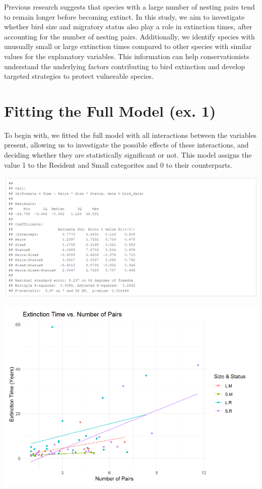 \documentclass{article}
\begin{document}
Previous research suggests that species with a large number of nesting pairs tend to remain longer before becoming extinct. In this study, we aim to investigate whether bird size and migratory status also play a role in extinction times, after accounting for the number of nesting pairs. Additionally, we identify species with unusually small or large extinction times compared to other species with similar values for the explanatory variables. This information can help conservationists understand the underlying factors contributing to bird extinction and develop targeted strategies to protect vulnerable species.

\section{Fitting the Full Model (ex. 1)}
To begin with, we fitted the full model with all interactions between the variables present, allowing us to investigate the possible effects of these interactions,
and deciding whether they are statistically significant or not. This model assigns the value 1 to the Resident and Small categorites and 0 to their counterparts.

\includegraphics[scale=0.5]{tables/all-multiplied.png}


\begin{center}
\includegraphics[scale=0.5]{graphs/graph1.png}
\end{center}
\end{document}
